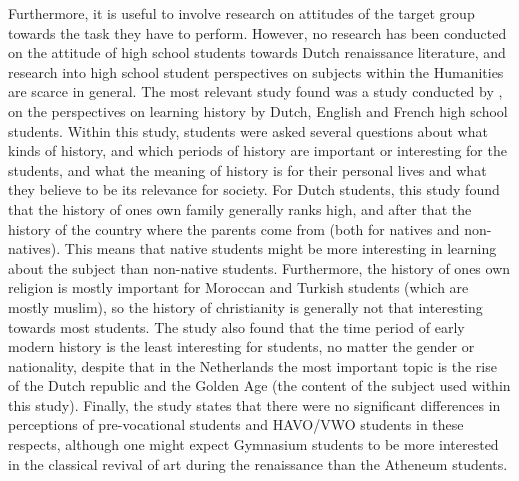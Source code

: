 Furthermore, it is useful to involve research on attitudes of the target group towards the task they have to perform. However, no research has been conducted on the attitude of high school students towards Dutch renaissance literature, and research into high school student perspectives on subjects within the Humanities are scarce in general. The most relevant study found was a study conducted by , on the perspectives on learning history by Dutch, English and French high school students. Within this study, students were asked several questions about what kinds of history, and which periods of history are important or interesting for the students, and what the meaning of history is for their personal lives and what they believe to be its relevance for society. For Dutch students, this study found that the history of ones own family generally ranks high, and after that the history of the country where the parents come from (both for natives and non-natives). This means that native students might be more interesting in learning about the subject than non-native students. Furthermore, the history of ones own religion is mostly important for Moroccan and Turkish students (which are mostly muslim), so the history of christianity is generally not that interesting towards most students. The study also found that the time period of early modern history is the least interesting for students, no matter the gender or nationality, despite that in the Netherlands the most important topic is the rise of the Dutch republic and the Golden Age (the content of the subject used within this study). Finally, the study states that there were no significant differences in perceptions of pre-vocational students and HAVO/VWO students in these respects, although one might expect Gymnasium students to be more interested in the classical revival of art during the renaissance than the Atheneum students.



